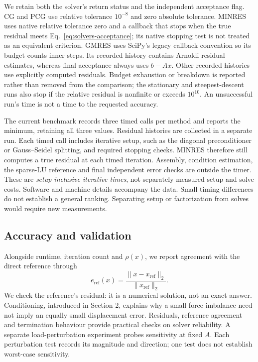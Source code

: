 We retain both the solver's return status and the independent acceptance
flag. CG and PCG use relative tolerance $10^{-8}$ and zero absolute
tolerance. MINRES uses native relative tolerance zero and a callback
that stops when the true residual meets Eq.~\eqref{eq:solvers-acceptance};
its native stopping test is not treated as an equivalent criterion.
GMRES uses SciPy's legacy callback convention so its budget counts inner
steps. Its recorded history contains Arnoldi residual estimates, whereas
final acceptance always uses $b-Ax$. Other recorded histories use explicitly
computed residuals. Budget exhaustion or breakdown is reported rather
than removed from the comparison; the stationary and steepest-descent
runs also stop if the relative residual is nonfinite or exceeds $10^{10}$.
An unsuccessful run's time is not a time to the requested accuracy.

The current benchmark records three timed calls per method and reports
the minimum, retaining all three values. Residual histories are collected
in a separate run. Each timed call includes iterative setup, such as the
diagonal preconditioner or Gauss--Seidel splitting, and required stopping
checks. MINRES therefore still computes a true residual at each timed
iteration. Assembly, condition estimation, the sparse-LU reference and
final independent error checks are outside the timer. These are
\emph{setup-inclusive iterative times}, not separately measured setup and
solve costs. Software and machine details accompany the data. Small timing differences
do not establish a general ranking. Separating setup or factorization
from solves would require new measurements.

\subsection{Accuracy and validation}
Alongside runtime, iteration count and $\rho(x)$, we report agreement with
the direct reference through
\begin{equation}
 e_{\mathrm{ref}}(x)=
 \frac{\lVert x-x_{\mathrm{ref}}\rVert_2}{\lVert x_{\mathrm{ref}}\rVert_2}.
 \label{eq:solvers-reference-error}
\end{equation}
We check the reference's residual: it is a numerical solution, not an
exact answer. Conditioning, introduced in Section 2, explains why a small
force imbalance need not imply an equally small displacement error.
Residuals, reference agreement and termination behaviour provide practical
checks on solver reliability. A separate load-perturbation experiment
probes sensitivity at fixed $A$. Each perturbation test records its
magnitude and direction; one test does not establish worst-case sensitivity.

